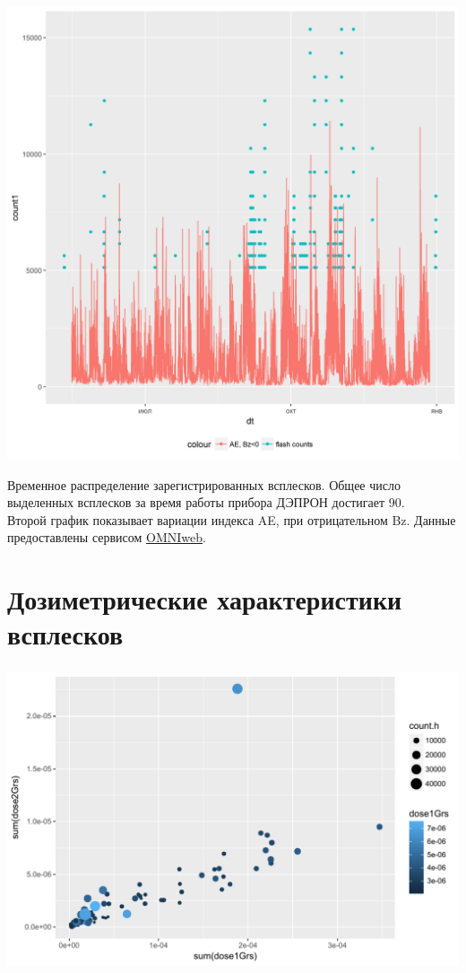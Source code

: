 \documentclass[t, aspectratio=43]{beamer}
\begin{document}
\begin{frame}	
\frametitle{\insertsection} 
%
%
\begin{center}
	\includegraphics[width=0.55\linewidth]{images/flashAEbz}
\end{center}
\tiny{Временное распределение зарегистрированных всплесков. Общее число выделенных всплесков за время работы прибора ДЭПРОН достигает 90.\\ Второй график показывает вариации индекса AE, при отрицательном Bz. Данные предоставлены сервисом  \href{https://omniweb.gsfc.nasa.gov/}{OMNIweb}.}

\end{frame}
\section{Дозиметрические характеристики всплесков}

\begin{frame}	
\frametitle{\insertsection} 
\begin{center}
	\includegraphics[width=1\linewidth]{images/dose2vsdose1}
\end{center}


\end{frame}
\end{document}
